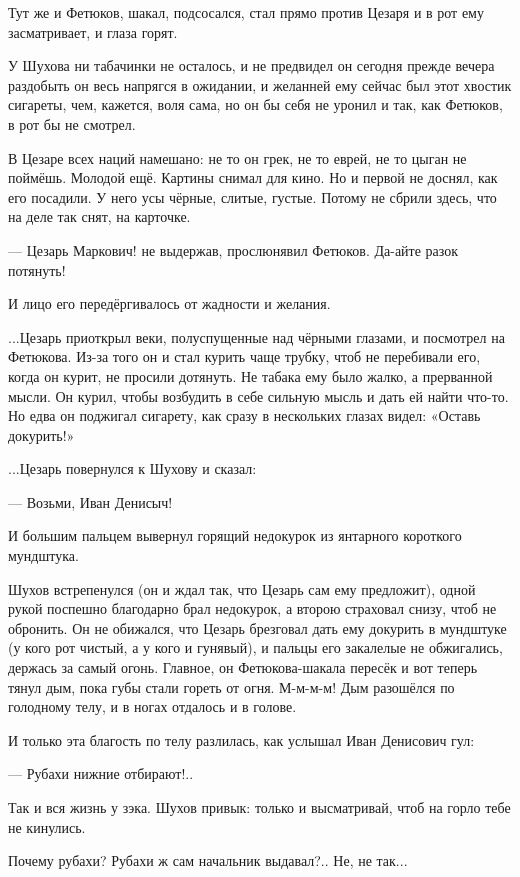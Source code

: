 Тут же и Фетюков, шакал, подсосался, стал прямо против Цезаря и в рот ему засматривает, и
глаза горят.

У Шухова ни табачинки не осталось, и не предвидел он сегодня прежде вечера раздобыть \dash он
весь напрягся в ожидании, и желанней ему сейчас был этот хвостик сигареты, чем, кажется, воля
сама, \dash но он бы себя не уронил и так, как Фетюков, в рот бы не смотрел.

В Цезаре всех наций намешано: не то он грек, не то еврей, не то цыган \dash не поймёшь. Молодой ещё.
Картины снимал для кино. Но и первой не доснял, как его посадили. У него усы чёрные, слитые,
густые. Потому не сбрили здесь, что на деле так снят, на карточке.

--- Цезарь Маркович! \dash не выдержав, прослюнявил Фетюков. \Dash Да-айте разок потянуть!

И лицо его передёргивалось от жадности и желания.

...Цезарь приоткрыл веки, полуспущенные над чёрными глазами, и посмотрел на Фетюкова. Из-за
того он и стал курить чаще трубку, чтоб не перебивали его, когда он курит, не просили
дотянуть. Не табака ему было жалко, а прерванной мысли. Он курил, чтобы возбудить в себе
сильную мысль и дать ей найти что-то. Но едва он поджигал сигарету, как сразу в нескольких
глазах видел: «Оставь докурить!»

...Цезарь повернулся к Шухову и сказал:

--- Возьми, Иван Денисыч!

И большим пальцем вывернул горящий недокурок из янтарного короткого мундштука.

Шухов встрепенулся (он и ждал так, что Цезарь сам ему предложит), одной рукой поспешно
благодарно брал недокурок, а второю страховал снизу, чтоб не обронить. Он не обижался, что
Цезарь брезговал дать ему докурить в мундштуке (у кого рот чистый, а у кого и гунявый), и
пальцы его закалелые не обжигались, держась за самый огонь. Главное, он Фетюкова-шакала
пересёк и вот теперь тянул дым, пока губы стали гореть от огня. М-м-м-м! Дым разошёлся по
голодному телу, и в ногах отдалось и в голове.

И только эта благость по телу разлилась, как услышал Иван Денисович гул:

--- Рубахи нижние отбирают!..

Так и вся жизнь у зэка. Шухов привык: только и высматривай, чтоб на горло тебе не кинулись.

Почему \dash рубахи? Рубахи ж сам начальник выдавал?.. Не, не так...

